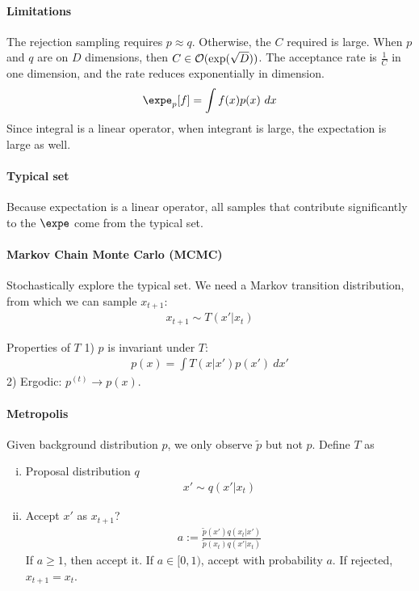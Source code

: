 \documentclass{article}
\begin{document}
	\paragraph{Limitations} The rejection sampling requires $p \approx q$. Otherwise, the $C$ required is large. When $p$ and $q$ are on $D$ dimensions, then $C \in \mathcal{{O}}(\exp(\sqrt{D}))$. The acceptance rate is $\frac{1}{C}$ in one dimension, and the rate reduces exponentially in dimension.
	\begin{align}
		\expe_p [f] = \int f(x) p(x)\ dx
	\end{align}
	Since integral is a linear operator, when integrant is large, the expectation is large as well.
	
	\paragraph{Typical set} Because expectation is a linear operator, all samples that contribute significantly to the $\expe$ come from the typical set. 

	\paragraph{Markov Chain Monte Carlo (MCMC)} Stochastically explore the typical set. We need a Markov transition distribution, from which we can sample $x_{t+1}$:
	\begin{align}
		x_{t+1} \sim T(x'|x_t)
	\end{align}
	\begin{proposition} Properties of $T$
		1) $p$ is invariant under $T$:
		\begin{align}
			p(x) = \int T(x|x') p(x')\ dx'
		\end{align}
		2) Ergodic: $p^{(t)} \to p(x)$.
	\end{proposition}
	
	\paragraph{Metropolis} Given background distribution $p$, we only observe $\tilde{p}$ but not $p$. Define $T$ as
	\begin{enumerate}[(i)]
		\item Proposal distribution $q$
		\begin{align}
			x' \sim q(x'|x_t)
		\end{align}
		\item Accept $x'$ as $x_{t+1}$? 
		\begin{align}
			a := \frac{\tilde{p}(x') q(x_t|x')}{\tilde{p}(x_t) q(x'|x_t)}
		\end{align}
		If $a \geq 1$, then accept it. 
		If $a \in [0, 1)$, accept with probability $a$. 
		If rejected, $x_{t+1} = x_t$.
	\end{enumerate}
	
\end{document}
